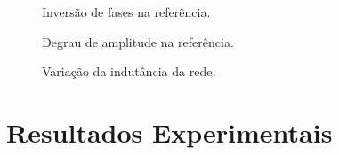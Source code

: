 	\begin{figure}[htb]
    \centering
      \def\svgwidth{0.8\textwidth}
      
    \renewcommand\figurename{Fig.}
    \caption{Inversão de fases na referência.}
    \label{fig:i2_simulacao_inv_fase}
  \end{figure}

  \begin{figure}[htb]
    \centering
      \def\svgwidth{0.8\textwidth}
      
    \renewcommand\figurename{Fig.}
    \caption{Degrau de amplitude na referência.}
    \label{fig:i2_simulacao_degrau}
  \end{figure}

  \begin{figure}[htb]
    \centering
      \def\svgwidth{0.8\textwidth}
      
    \renewcommand\figurename{Fig.}
    \caption{Variação da indutância da rede.}
    \label{fig:i2_simulacao_L_rede}
  \end{figure}


\section{Resultados Experimentais}



